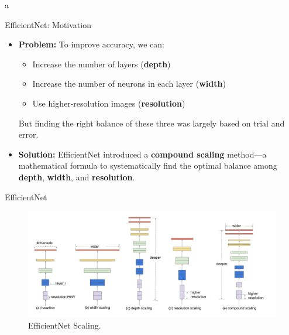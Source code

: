 a\documentclass[10pt]{beamer}
\theoremstyle{remark}
\theoremstyle{definition}
\begin{document}
\begin{frame}{EfficientNet: Motivation}
\begin{itemize}
    \item \textbf{Problem:} To improve accuracy, we can:
    \begin{itemize}
        \item Increase the number of layers (\textbf{depth})
        \item Increase the number of neurons in each layer (\textbf{width})
        \item Use higher-resolution images (\textbf{resolution})
    \end{itemize}
    But finding the right balance of these three was largely based on trial and error.
    
    \item \textbf{Solution:} EfficientNet introduced a \textbf{compound scaling} method—a mathematical formula to systematically find the optimal balance among \textbf{depth}, \textbf{width}, and \textbf{resolution}.
\end{itemize}
\end{frame}

\begin{frame}{EfficientNet}

    \begin{figure}
        \centering
        \includegraphics[width=\linewidth]{./images/ENet_1.png}
        \caption{EfficientNet Scaling.}
    \end{figure}
\end{frame}
\end{document}

